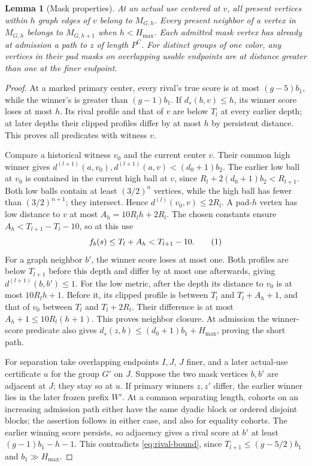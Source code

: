 \documentclass[11pt]{article}
\newtheorem{lemma}[theorem]{Lemma}
\theoremstyle{definition}
\newcommand{\eqtag}[1]{\refstepcounter{equation}\tag{\theequation}\label{#1}}
\numberwithin{equation}{section}
\begin{document}
\begin{lemma}[Mask properties]\label{lem:masks}
At an actual use centered at $v$, all present vertices within $h$ graph edges of $v$ belong to $M_{G,h}$. Every present neighbor of a vertex in $M_{G,h}$ belongs to $M_{G,h+1}$ when $h<H_{\max}$. Each admitted mask vertex has already at admission a path to $z$ of length $P^C$. For distinct groups of one color, any vertices in their pad masks on overlapping usable endpoints are at distance greater than one at the finer endpoint.
\end{lemma}
\begin{proof}
At a marked primary center, every rival's true score is at most $(g-5)b_1$, while the winner's is greater than $(g-1)b_1$. If $d_s(b,v)\le h$, its winner score loses at most $h$. Its rival profile and that of $v$ are below $T_l$ at every earlier depth; at later depths their clipped profiles differ by at most $h$ by persistent distance. This proves all predicates with witness $v$.

Compare a historical witness $v_0$ and the current center $v$. Their common high winner gives $d^{(l+1)}(a,v_0),d^{(l+1)}(a,v)<(d_0+1)b_2$. The earlier low ball at $v_0$ is contained in the current high ball at $v$, since $R_l+2(d_0+1)b_2<R_{l+1}$. Both low balls contain at least $(3/2)^n$ vertices, while the high ball has fewer than $(3/2)^{n+1}$; they intersect. Hence $d^{(l)}(v_0,v)\le2R_l$. A pad-$h$ vertex has low distance to $v$ at most $A_h=10R_lh+2R_l$. The chosen constants ensure $A_h<T_{l+1}-T_l-10$, so at this use
\[
 f_b(s)\le T_l+A_h<T_{l+1}-10.
 \eqtag{eq:rival-bound}
\]
For a graph neighbor $b'$, the winner score loses at most one. Both profiles are below $T_{l+1}$ before this depth and differ by at most one afterwards, giving $d^{(l+1)}(b,b')\le1$. For the low metric, after the depth its distance to $v_0$ is at most $10R_lh+1$. Before it, its clipped profile is between $T_l$ and $T_l+A_h+1$, and that of $v_0$ between $T_l$ and $T_l+2R_l$. Their difference is at most $A_h+1\le10R_l(h+1)$. This proves neighbor closure. At admission the winner-score predicate also gives $d_s(z,b)\le(d_0+1)b_1+H_{\max}$, proving the short path.

For separation take overlapping endpoints $I,J$, $J$ finer, and a later actual-use certificate $u$ for the group $G'$ on $J$. Suppose the two mask vertices $b,b'$ are adjacent at $J$; they stay so at $u$. If primary winners $z,z'$ differ, the earlier winner lies in the later frozen prefix $W'$. At a common separating length, cohorts on an increasing admission path either have the same dyadic block or ordered disjoint blocks; the assertion follows in either case, and also for equality cohorts. The earlier winning score persists, so adjacency gives a rival score at $b'$ at least $(g-1)b_1-h-1$. This contradicts \eqref{eq:rival-bound}, since $T_{l+1}\le(g-5/2)b_1$ and $b_1\gg H_{\max}$.


\end{proof}
\end{document}
